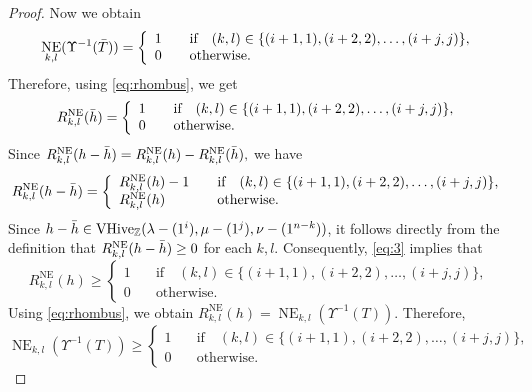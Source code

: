 \documentclass[11pt,reqno]{amsart}
\DeclareMathOperator{\VHive}{VHive}
\DeclareMathOperator{\NE}{NE}
\begin{document}
\begin{proof}
Now we obtain
\begin{equation}
\label{eq:1}
\NE_{k,l}(\Upsilon^{-1}(\Bar{T})) = \left\{ 
    \begin{array}{ll}
        1 & \quad \text{if} \quad (k,l) \in \{ (i+1,1),(i+2,2),\dots, (i+j,j) \},  \\
        0 & \quad  \text{otherwise}. 
    \end{array}  \right. 
\end{equation}
Therefore, using \eqref{eq:rhombus}, we get
\begin{equation}
\label{eq:2}
R^{\NE}_{k,l}(\Bar{h}) = \left\{ 
    \begin{array}{ll}
        1 & \quad \text{if} \quad (k,l) \in \{ (i+1,1),(i+2,2),\dots, (i+j,j) \},  \\
        0 & \quad  \text{otherwise}. 
    \end{array}  \right. 
\end{equation}
Since $R^{\NE}_{k,l}(h-\Bar{h})=R^{\NE}_{k,l}(h)-R^{\NE}_{k,l}(\Bar{h}),$ we have
\begin{equation}
\label{eq:3}
R^{\NE}_{k,l}(h-\Bar{h}) = \left\{ 
    \begin{array}{ll}
        R^{\NE}_{k,l}(h)-1 & \quad \text{if} \quad (k,l) \in \{ (i+1,1),(i+2,2),\dots, (i+j,j) \},  \\
        R^{\NE}_{k,l}(h) & \quad \text{otherwise}. 
    \end{array}  \right. 
\end{equation}
Since $h-\Bar{h} \in \VHive_{\mathbb{Z}}(\lambda-(1^i),\mu-(1^j),\nu-(1^{n-k}))$, it follows directly from the definition that $R^{\NE}_{k,l}(h-\Bar{h}) \geq 0$ for each $k,l$. Consequently, \eqref{eq:3} implies that
\begin{equation}
\label{eq:4}
R^{\NE}_{k,l}(h) \geq \left\{ 
    \begin{array}{ll}
        1 & \quad \text{if} \quad (k,l) \in \{ (i+1,1),(i+2,2),\dots, (i+j,j) \},  \\
        0 & \quad \text{otherwise}. 
    \end{array}  \right. 
\end{equation}
Using \eqref{eq:rhombus}, we obtain $R^{\NE}_{k,l}(h) =\NE_{k,l}(\Upsilon^{-1}(T))$. Therefore,
\begin{equation}
\label{eq:NE}
\NE_{k,l}(\Upsilon^{-1}(T)) \geq \left\{ 
    \begin{array}{ll}
        1 & \quad \text{if} \quad (k,l) \in \{ (i+1,1),(i+2,2),\dots, (i+j,j) \},  \\
        0 & \quad \text{otherwise}. 

\end{array}
\end{equation}
\end{proof}
\end{document}
